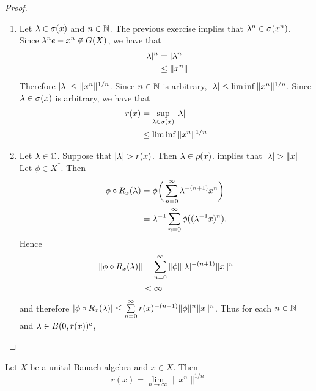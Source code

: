 \documentclass{book}
\begin{document}
	\begin{proof}\
		\begin{enumerate}
			\item Let $\lambda \in \sigma(x)$ and $n \in \mathbb{N}$. The previous exercise implies that $\lambda^n \in \sigma(x^n)$. Since $\lambda^ne - x^n \not \in G(X)$, we have that
			\begin{align*}
				|\lambda|^n
				& = |\lambda^n| \\
				& \leq \|x^n\|
			\end{align*}
			Therefore $|\lambda| \leq \|x^n\|^{1/n}$. Since $n \in \mathbb{N}$ is arbitrary, $|\lambda| \leq \liminf \|x^n\|^{1/n}$. Since $\lambda \in \sigma(x)$ is arbitrary, we have that 
			\begin{align*}
				r(x)
				& = \sup_{\lambda \in \sigma(x)} |\lambda| \\
				& \leq \liminf \|x^n\|^{1/n}
			\end{align*} 
			\item Let $\lambda \in \mathbb{C}$. Suppose that $|\lambda| > r(x)$. Then $\lambda \in \rho(x)$.  implies that $|\lambda| > \|x\|$  Let $\phi \in X^*$. Then
			\begin{align*}
				\phi \circ R_x(\lambda) 
				& = \phi \bigg( \sum\limits_{n=0}^{\infty} \lambda^{-(n+1)} x^n \bigg) \\
				& = \lambda^{-1} \sum\limits_{n=0}^{\infty} \phi((\lambda^{-1} x)^n).
			\end{align*}
			Hence 
			\begin{align*}
				\|\phi \circ R_x(\lambda)\|
				& = \sum\limits_{n=0}^{\infty} \|\phi\| |\lambda|^{-(n+1)}  \|x\|^n \\
				& < \infty 
			\end{align*}
			and therefore $|\phi \circ R_x(\lambda)| \leq \sum\limits_{n=0}^{\infty} r(x)^{-(n+1)}\|\phi\|^n\|x\|^n$. Thus for each $n \in \mathbb{N}$ and $\lambda \in \bar{B}(0, r(x))^c$, 
			
		\end{enumerate}
	\end{proof}
	
	\begin{ex}
		Let $X$ be a unital Banach algebra and $x \in X$. Then 
		$$r(x) = \lim_{n \rightarrow \infty} \|x^n\|^{1/n}$$
	\end{ex}
\end{document}
